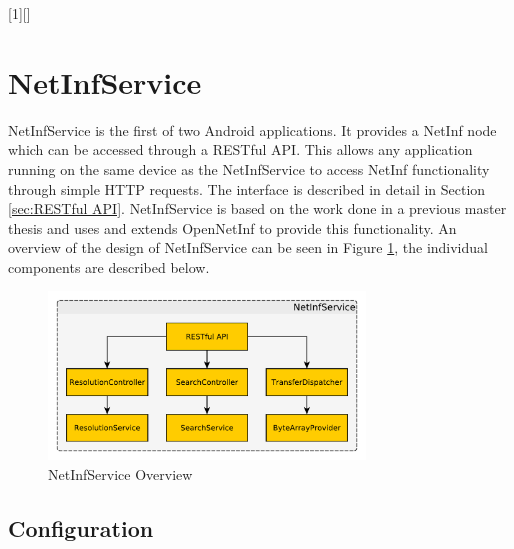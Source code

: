 
[1][]%
	{\minipage{\linewidth} 
		}
	{\endminipage}

\section{NetInfService}
\label{sec:NetInfService}

NetInfService is the first of two Android applications. It provides a NetInf node which can be accessed through a RESTful API. This allows any application running on the same device as the NetInfService to access NetInf functionality through simple HTTP requests. The interface is described in detail in Section \ref{sec:RESTful API}. NetInfService is based on the work done in a previous master thesis \cite{masterthesis} and uses and extends OpenNetInf to provide this functionality. An overview of the design of NetInfService can be seen in Figure \ref{fig:netinfserviceoverview}, the individual components are described below.

\begin{figure}[h!]
	\centering
		\includegraphics[width=0.75\textwidth]{./img/netinfservice}
    	\caption{NetInfService Overview}
	\label{fig:netinfserviceoverview}
\end{figure}

\subsection{Configuration}
\label{sec:Configuration}

